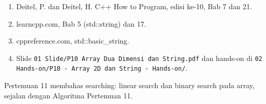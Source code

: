 \documentclass[a4paper]{article}
\begin{document}
\begin{enumerate}
\item Deitel, P. dan Deitel, H. C++ How to Program, edisi ke-10, Bab 7 dan 21.
\item learncpp.com, Bab 5 (std::string) dan 17.
\item cppreference.com, std::basic\_string.
\item Slide \texttt{01 Slide/P10 Array Dua Dimensi dan String.pdf} dan hands-on di \texttt{02 Hands-on/P10 - Array 2D dan String - Hands-on/}.
\end{enumerate}
\begin{Penting}
Pertemuan 11 membahas searching: linear search dan binary search pada array, sejalan dengan Algoritma Pertemuan 11.
\end{Penting}
\end{document}
